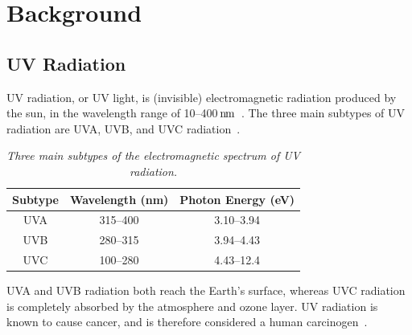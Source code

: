 \documentclass[12pt,openany,a4paper]{book}
\newcommand{\tab}[1]  {Table~\ref{#1}}		%
\newcommand{\pack}	{\hspace{-0.08em}}
\newcommand{\nm}	{\ensuremath{\rm\,n\pack m}}
\begin{document}
\chapter{Background}




\section{UV Radiation}

UV radiation, or UV light, is (invisible) electromagnetic radiation produced by the
sun, in the wavelength range of 10--400\nm~\cite{cancer_council}. The three main subtypes of UV
radiation are UVA, UVB, and UVC radiation~\cite[\tab{tab:uv_radiation}]{spacewx}.

\begin{table}[h]
\caption{\sl Three main subtypes of the electromagnetic spectrum of UV
radiation.}
\label{tab:uv_radiation}
\begin{center}
\begin{tabular}{|c|c|c|}
\hline
Subtype & Wavelength (nm) & Photon Energy (eV) \\
\hline
UVA & 315--400 & 3.10--3.94 \\
UVB & 280--315 & 3.94--4.43 \\
UVC & 100--280 & 4.43--12.4 \\
\hline
\end{tabular}
\end{center}
\end{table}

UVA and UVB radiation both reach the Earth's surface, whereas UVC radiation is
completely absorbed by the atmosphere and ozone layer. UV radiation is
known to cause cancer, and is therefore considered a human carcinogen~\cite{cancer_council}.
\end{document}
